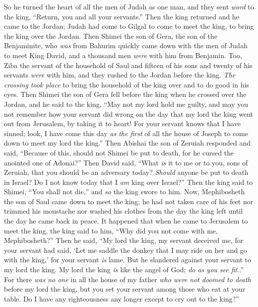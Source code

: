 \begin{biblechapter}
\verse So he turned the heart of all the men of Judah as one man, and they sent \textit{word} to the king, “Return, you and all your servants.”
\verse Then the king returned and he came to the Jordan; Judah had come to Gilgal to come to meet the king, to bring the king over the Jordan.
\verse Then Shimei the son of Gera, the son of the Benjaminite, who \textit{was} from Bahurim quickly came down with the men of Judah to meet King David,
\verse and a thousand men \textit{were} with him from Benjamin. Too, Ziba the servant of the household of Saul and fifteen of his sons and twenty of his servants \textit{were} with him, and they rushed to the Jordan before the king.
\verse \textit{The crossing took place} to bring the household of the king over and to do good in his eyes. Then Shimei the son of Gera fell before the king when he crossed over the Jordan,
\verse and he said to the king, “May not my lord hold me guilty, and may you not remember how your servant did wrong on the day that my lord the king went out from Jerusalem, by taking it to heart!
\verse For your servant knows that I have sinned; look, I have come this day \textit{as the first} of all the house of Joseph to come down to meet my lord the king.”
\verse Then Abishai the son of Zeruiah responded and said, “Because of this, should not Shimei be put to death, for he cursed the anointed one of Adonai?”
\verse Then David said, “What \textit{is} it to me or to you, sons of Zeruiah, that you should be an adversary today? \textit{Should} anyone be put to death in Israel? Do I not know today that I \textit{am} king over Israel?”
\verse Then the king said to Shimei, “You shall not die,” and \textit{so} the king swore to him.
\verse Now, Mephibosheth the son of Saul came down to meet the king; he had not taken care of his feet nor trimmed his moustache nor washed his clothes from the day the king left until the day he came back in peace.
\verse It happened that when he came to Jerusalem to meet the king, the king said to him, “Why did you not come with me, Mephibosheth?”
\verse Then he said, “My lord the king, my servant deceived me, for your servant had said, ‘Let me saddle the donkey that I may ride on her and go with the king,’ for your servant \textit{is} lame.
\verse But he slandered against your servant to my lord the king. My lord the king \textit{is} like the angel of God; \textit{do as you see fit.}.”
\verse For there \textit{was no one} in all the house of my father \textit{who were not doomed to death} before my lord the king, but you set your servant among those who eat at your table. Do I have any righteousness any longer except to cry out to the king?”

\end{biblechapter}
